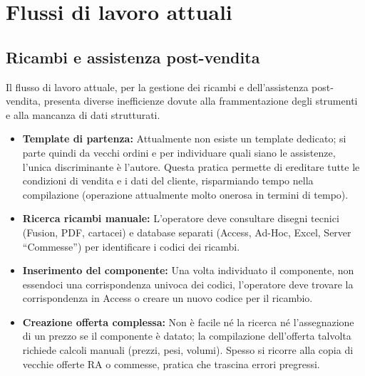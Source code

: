 \section{Flussi di lavoro attuali}

\subsection{Ricambi e assistenza post-vendita}
Il flusso di lavoro attuale, per la gestione dei ricambi e dell'assistenza
post-vendita, presenta diverse inefficienze dovute alla frammentazione degli strumenti
e alla mancanza di dati strutturati.

\begin{itemize}
      \item \textbf{Template di partenza:} Attualmente non esiste un template dedicato; si parte quindi
            da vecchi ordini e per individuare quali siano le assistenze, l'unica discriminante è
            l'autore.
            Questa pratica permette di ereditare tutte le condizioni di vendita e i dati del cliente,
            risparmiando tempo nella compilazione (operazione attualmente molto onerosa in termini di tempo).
      \item \textbf{Ricerca ricambi manuale:} L'operatore deve consultare disegni tecnici (Fusion, PDF, cartacei)
            e database separati (Access, Ad-Hoc, Excel, Server ``Commesse'') per identificare i codici dei ricambi.
      \item \textbf{Inserimento del componente:} Una volta individuato il componente, non essendoci una
            corrispondenza univoca dei codici, l'operatore deve trovare la corrispondenza in
            Access o creare un nuovo codice per il ricambio.
      \item \textbf{Creazione offerta complessa:} Non è facile né la ricerca né l'assegnazione di un prezzo
            se il componente è datato; la compilazione dell'offerta talvolta richiede calcoli manuali (prezzi, pesi, volumi).
            Spesso si ricorre alla copia di vecchie offerte \ac{RA} o commesse, pratica che trascina errori pregressi.
\end{itemize}

